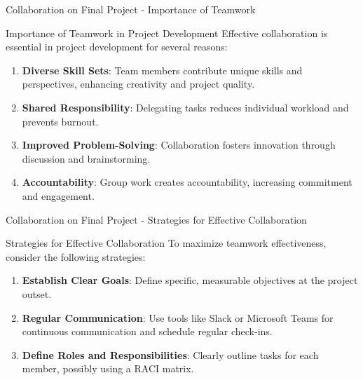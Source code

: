 \documentclass[aspectratio=169]{beamer}
\begin{document}
\begin{frame}[fragile]{Collaboration on Final Project - Importance of Teamwork}
    \begin{block}{Importance of Teamwork in Project Development}
        Effective collaboration is essential in project development for several reasons:
    \end{block}
    \begin{enumerate}
        \item \textbf{Diverse Skill Sets}: Team members contribute unique skills and perspectives, enhancing creativity and project quality.
        \item \textbf{Shared Responsibility}: Delegating tasks reduces individual workload and prevents burnout.
        \item \textbf{Improved Problem-Solving}: Collaboration fosters innovation through discussion and brainstorming.
        \item \textbf{Accountability}: Group work creates accountability, increasing commitment and engagement.
    \end{enumerate}
\end{frame}

\begin{frame}[fragile]{Collaboration on Final Project - Strategies for Effective Collaboration}
    \begin{block}{Strategies for Effective Collaboration}
        To maximize teamwork effectiveness, consider the following strategies:
    \end{block}
    \begin{enumerate}
        \item \textbf{Establish Clear Goals}: Define specific, measurable objectives at the project outset.
        \item \textbf{Regular Communication}: Use tools like Slack or Microsoft Teams for continuous communication and schedule regular check-ins.
        \item \textbf{Define Roles and Responsibilities}: Clearly outline tasks for each member, possibly using a RACI matrix.
    \end{enumerate}
\end{frame}
\end{document}
